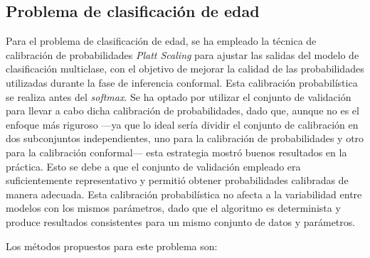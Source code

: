 \FloatBarrier


\subsection{Problema de clasificación de edad}




Para el problema de clasificación de edad, se ha empleado la técnica de calibración de probabilidades \textit{Platt Scaling} para ajustar las salidas del modelo de clasificación multiclase, con el objetivo de mejorar la calidad de las probabilidades utilizadas durante la fase de inferencia conformal. Esta calibración probabilística se realiza antes del \textit{softmax}. Se ha optado por utilizar el conjunto de validación para llevar a cabo dicha calibración de probabilidades, dado que, aunque no es el enfoque más riguroso ---ya que lo ideal sería dividir el conjunto de calibración en dos subconjuntos independientes, uno para la calibración de probabilidades y otro para la calibración conformal--- esta estrategia mostró buenos resultados en la práctica. Esto se debe a que el conjunto de validación empleado era suficientemente representativo y permitió obtener probabilidades calibradas de manera adecuada. Esta calibración probabilística no afecta a la variabilidad entre modelos con los mismos parámetros, dado que el algoritmo es determinista y produce resultados consistentes para un mismo conjunto de datos y parámetros. 

Los métodos propuestos para este problema son:

